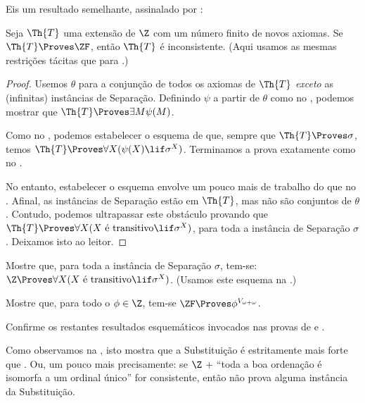\documentclass[../../../include/open-logic-section]{subfiles}
\begin{document}
Eis um resultado semelhante, assinalado por \citet[223]{Potter2004}:

\begin{prop}
	Seja $\Th{T}$ uma extensão de $\Z$ com um número finito de novos axiomas. Se $\Th{T} \Proves \ZF$, então $\Th{T}$ é inconsistente. (Aqui usamos as mesmas restrições tácitas que para .)
\end{prop}
\begin{proof}
	Usemos $\theta$ para a conjunção de todos os axiomas de $\Th{T}$ \emph{exceto} as (infinitas) instâncias de Separação. Definindo $\psi$ a partir de $\theta$ como no , podemos mostrar que $\Th{T} \Proves \exists M \psi(M)$. 
	
	Como no , podemos estabelecer o esquema de que, sempre que $\Th{T} \Proves \sigma$, temos $\Th{T} \Proves \forall X(\psi(X) \lif \sigma^X)$. Terminamos a prova exatamente como no .
	
	No entanto, estabelecer o esquema envolve um pouco mais de trabalho do que no . Afinal, as instâncias de Separação estão em $\Th{T}$, mas não são conjuntos de $\theta$. Contudo, podemos ultrapassar este obstáculo provando que $\Th{T} \Proves \forall X(X\text{ é transitivo} \lif \sigma^X)$, para toda a instância de Separação $\sigma$. Deixamos isto ao leitor. 
\end{proof}
\begin{prob}
	Mostre que, para toda a instância de Separação $\sigma$, tem-se: $\Z \Proves \forall X(X\text{ é transitivo} \lif \sigma^X)$. (Usamos este esquema na .)
\end{prob}
\begin{prob}
	Mostre que, para todo o $\phi \in \Z$, tem-se $\ZF \Proves \phi^{V_{\omega+\omega}}$.
\end{prob}
\begin{prob}
	Confirme os restantes resultados esquemáticos invocados nas provas de  e  .
\end{prob}

Como observamos na , isto mostra que a Substituição é estritamente mais forte que
. Ou, um pouco mais precisamente: se $\Z$ + ``toda a boa ordenação é isomorfa a um ordinal único'' for consistente, então não prova alguma instância da Substituição.


\end{document}
